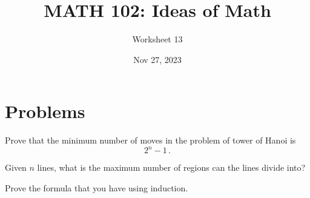 \documentclass[12pt]{amsart}
\title{ MATH 102: Ideas  of Math }
\author{ Worksheet 13 }
\date{Nov 27, 2023}
\begin{document}
\maketitle

\section{ Problems }
\begin{problem}
    Prove that the minimum number of moves in the problem of tower of
    Hanoi is 
    \begin{equation*}
        2^n - 1 \,.
    \end{equation*}
\end{problem}

\begin{problem}
  Given $n$ lines, what is the maximum number of regions can the lines divide into? 
  
  Prove the formula that you have using induction.
\end{problem}
\end{document}
